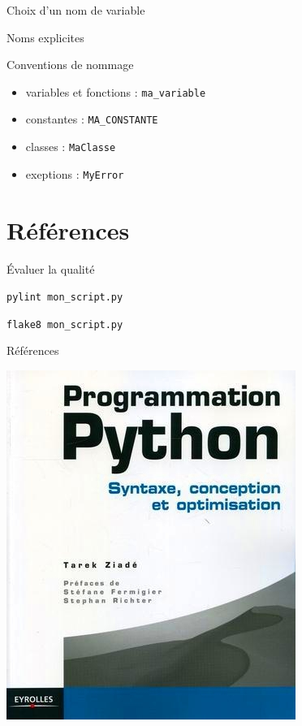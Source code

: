 \documentclass[xcolor=pdftex,dvipsnames,table,handout]{beamer}
\begin{document}
\begin{frame}{Choix d'un nom de variable}
\begin{center}
\Huge{Noms explicites}
\end{center}
\end{frame}

\begin{frame}{Conventions de nommage}
\begin{itemize}
    \item variables et fonctions : \texttt{ma\_variable}
    \item constantes : \texttt{MA\_CONSTANTE}
    \item classes : \texttt{MaClasse}
    \item exeptions : \texttt{MyError}
\end{itemize}
\end{frame}

\section{Références}

\begin{frame}{Évaluer la qualité}
\begin{center}
\Large{\texttt{pylint mon\_script.py}}

\Large{\texttt{flake8 mon\_script.py}}
\end{center}
\end{frame}

\begin{frame}{Références}
\begin{center}
\includegraphics[width=0.5\linewidth]{img/pp}
\end{center}
\end{frame}
\end{document}
